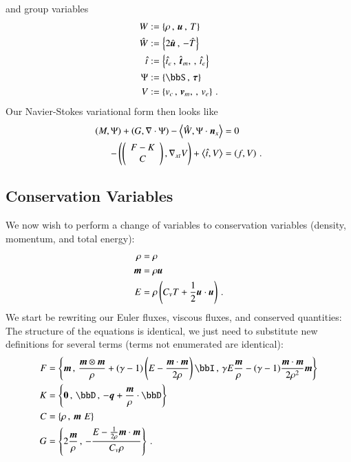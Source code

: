 \documentclass[preprint,12pt]{elsarticle}
\begin{document}
and group variables
\begin{align*}
W&:=\LRc{\rho\,,\,\bfu\,,\,T}\\
\hat W&:=\LRc{2\hat\bfu\,,\,-\hat T}\\
\hat t&:=\LRc{\hat t_e\,,\,\hat\bft_m,\,,\,\hat t_e}\\
\Psi&:=\LRc{\bbS\,,\,\bftau}\\
V&:=\LRc{v_c\,,\,\bfv_m,\,,\,v_e}\,.
\end{align*}
Our Navier-Stokes variational form then looks like
\begin{subequations}
\label{eq:shortFormNL}
\begin{align}
\left( M,\Psi \right)+\left( G,\nabla\cdot\Psi \right)-\left\langle \hat W,\Psi\cdot\boldsymbol n_x \right\rangle&=0\\
-\left( \left( \begin{array}{c} F-K\\ C\\ \end{array} \right),\nabla_{xt} V \right)+\left\langle \hat t,V \right\rangle&=\left( f,V \right)\,.
\end{align}
\end{subequations}

\subsection{Conservation Variables}
We now wish to perform a change of variables to conservation variables (density, momentum, and total energy):
\begin{align*}
\rho&=\rho\\
\boldsymbol m&=\rho\boldsymbol u\\
E&=\rho\left( C_v T+\frac{1}{2}\boldsymbol u\cdot\boldsymbol u \right)\,.
\end{align*}
We start be rewriting our Euler fluxes, viscous fluxes, and conserved quantities:
The structure of the equations is identical, we just need to substitute new definitions for several terms (terms not enumerated are identical):
\begin{align*}
F&=\LRc{\bfm\,,\,
\frac{\bfm\otimes\bfm}{\rho}+(\gamma-1)\LRp{E-\frac{\bfm\cdot\bfm}{2\rho}}\bbI\,,\,
\gamma E\frac{\bfm}{\rho}-(\gamma-1)\frac{\bfm\cdot\bfm}{2\rho^2}\bfm}\\
K&=\LRc{\boldsymbol 0\,,\,
\bbD\,,\,
-\bfq+\frac{\bfm}{\rho}\cdot\bbD}\\
C&=\LRc{\rho\,,\,
\bfm\,\,
E}\\
G&=\LRc{2\frac{\bfm}{\rho}\,,\,
-\frac{E-\frac{1}{2\rho}\bfm\cdot\bfm}{C_v\rho}}\,.
\end{align*}
\end{document}
